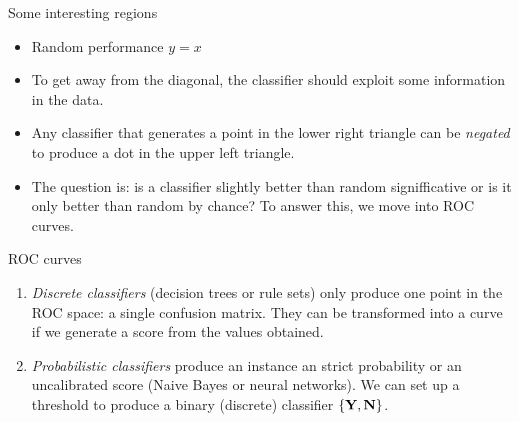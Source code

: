 \documentclass{beamer}
\begin{document}
\begin{frame}{Some interesting regions}
  \begin{itemize}
    \item Random performance $y=x$
    \item To get away from the diagonal, the classifier should exploit some information in the data.
    \item Any classifier that generates a point in the lower right triangle can be {\em negated} to produce a dot in the upper left triangle.
    \item The question is: is a classifier slightly better than random signifficative or is it only better than random by chance? To answer this, we move into ROC curves.
  \end{itemize}

\end{frame}

\begin{frame}{ROC curves}
  \begin{enumerate}
    \item {\em Discrete classifiers} (decision trees or rule sets) only produce one point in the ROC space: a single confusion matrix. They can be transformed into a curve if we generate a score from the values obtained.
    \item {\em Probabilistic classifiers} produce an instance an strict probability or an uncalibrated score (Naive Bayes or neural networks). We can set up a threshold to produce a binary (discrete) classifier $\{\textbf{Y},\textbf{N}\}$.
  \end{enumerate}
\end{frame}
\end{document}
